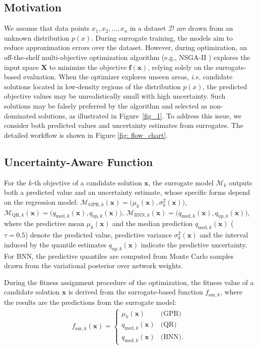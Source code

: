 \documentclass{article}
\begin{document}
\subsection{Motivation}
We assume that data points $x_1, x_2, \ldots, x_n$ in a dataset $\mathcal{D}$ are drawn from an unknown distribution $p(x)$. During surrogate training, the models aim to reduce approximation errors over the dataset. However, during optimization, an off-the-shelf multi-objective optimization algorithm (e.g., NSGA-II \cite{nsga_ii}) explores the input space $\boldsymbol{X}$ to minimize the objective $\boldsymbol{f}(\boldsymbol{x})$, relying solely on the surrogate-based evaluation. When the optimizer explores unseen areas, \emph{i.e.} candidate solutions located in low-density regions of the distribution $p(x)$, the predicted objective values may be unrealistically small with high uncertainty. Such solutions may be falsely preferred by the algorithm and selected as non-dominated solutions, as illustrated in Figure~\ref{fig_1}. To address this issue, we consider both predicted values and uncertainty estimates from surrogates. The detailed workflow is shown in Figure \ref{fig: flow_chart}.

\subsection{Uncertainty-Aware Function}
For the $k$-th objective of a candidate solution $\boldsymbol{x}$, the surrogate model $\mathcal{M}_k$ outputs both a predicted value and an uncertainty estimate, whose specific forms depend on the regression model:
$\mathcal{M}_{\text{GPR},k}(\boldsymbol{x})
= \big( \mu_k(\boldsymbol{x}), \sigma_k^2(\boldsymbol{x}) \big)$,
$\mathcal{M}_{\text{QR},k}(\boldsymbol{x})
= \big( q_{\text{med},k}(\boldsymbol{x}), q_{\text{up},k}(\boldsymbol{x}) \big)$,
$\mathcal{M}_{\text{BNN},k}(\boldsymbol{x})
= \big(
q_{\text{med},k}(\boldsymbol{x}),
q_{\text{up},k}(\boldsymbol{x})
\big)$,
where the predictive mean $\mu_k(\boldsymbol{x})$ and the median prediction $q_{\text{med},k}(\boldsymbol{x})$ ($\tau=0.5$) denote the predicted value, predictive variance $\sigma_k^2(\boldsymbol{x})$ and the interval induced by the quantile estimates $q_{\text{up},k}(\boldsymbol{x})$ indicate the predictive uncertainty. For BNN, the predictive quantiles are computed from Monte Carlo samples drawn from the variational posterior over network weights.

During the fitness assignment procedure of the optimization, the fitness value of a candidate solution $\boldsymbol{x}$ is derived from the surrogate-based function $f_{\text{sur},k}$, where the results are the predictions from the surrogate model:
\begin{align}
f_{\text{sur},k}(\boldsymbol{x}) =
\begin{cases}
\mu_k(\boldsymbol{x}) & \text{(GPR)} \\
q_{\text{med},k}(\boldsymbol{x}) & \text{(QR)} \\
q_{\text{med},k}(\boldsymbol{x}) & \text{(BNN)}.
\end{cases}
\end{align}
\end{document}
